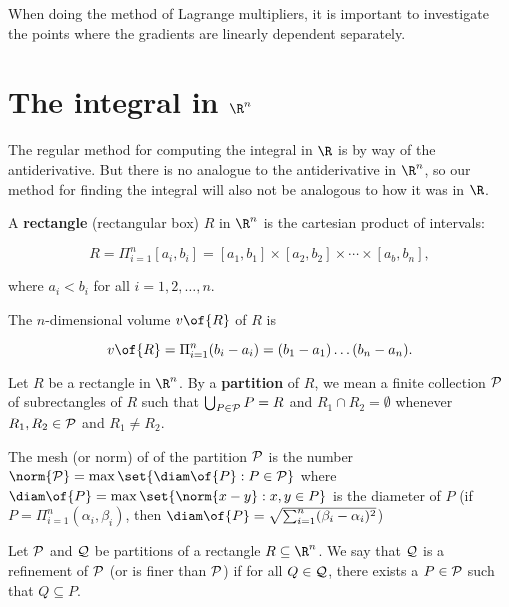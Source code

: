 \begin{remark}
    When doing the method of Lagrange multipliers, it is important to investigate the points where the gradients are linearly dependent separately.
\end{remark}

\section{The integral in $\R^n$}

\begin{remark}
    The regular method for computing the integral in $\R$ is by way of the antiderivative. But there is no analogue to the antiderivative in $\R^n$, so our method for finding the integral will also not be analogous to how it was in $\R$.
\end{remark}

\begin{definition}[a rectangle]
    A \textbf{rectangle} (rectangular box) $R$ in $\R^n$ is the cartesian product of intervals:

    \[R = \Pi_{i=1}^n [a_i,b_i] = [a_1,b_1] \times [a_2,b_2] \times \cdots \times [a_b, b_n],\]
    
    where $a_i < b_i$ for all $i = 1,2,\dots,n$.

    The $n$-dimensional volume $v\of{R}$ of $R$ is

    \[v\of{R} = \Pi_{i=1}^n (b_i - a_i) = (b_1 - a_1) \dots (b_n - a_n).\]
\end{definition}

\begin{definition}[a partition]
    Let $R$ be a rectangle in $\R^n$. By a \textbf{partition} of $R$, we mean a finite collection $\cal{P}$ of subrectangles of $R$ such that $\bigcup_{P \in \cal{P}}P = R$ and $R_1 \cap R_2 = \emptyset$ whenever $R_1, R_2 \in \cal{P}$ and $R_1 \neq R_2$.

    The mesh (or norm) of of the partition $\cal{P}$ is the number $\norm{\cal{P}} = \max\set{\diam\of{P}: P \in \cal{P}}$ where $\diam\of{P} = \max\set{\norm{x-y}: x,y \in P}$ is the diameter of $P$ (if $P = \Pi_{i=1}^n (\alpha_i, \beta_i)$, then $\diam\of{P} = \sqrt{\sum_{i=1}^{n} (\beta_i - \alpha_i)^2}$)
\end{definition}

\begin{definition}[a refinement]
    Let $\cal{P}$ and $\cal{Q}$ be partitions of a rectangle $R \subseteq \R^n$. We say that $\cal{Q}$ is a refinement of $\cal{P}$ (or is finer than $\cal{P}$) if for all $Q \in \cal{Q}$, there exists a $P \in \cal{P}$ such that $Q \subseteq P$.
\end{definition}

